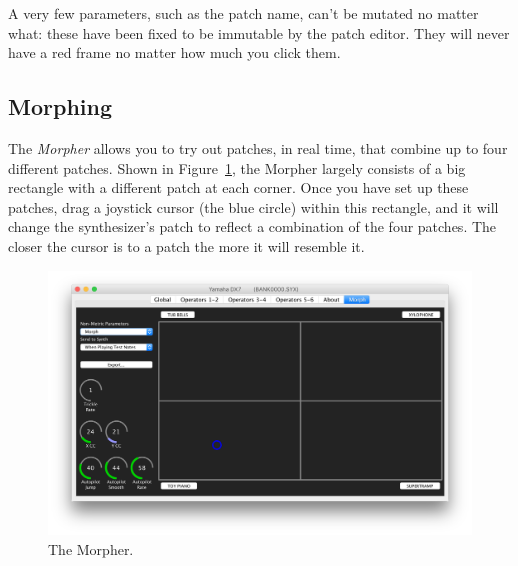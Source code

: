 \documentclass{article}
\begin{document}

A very few parameters, such as the patch name, can't be mutated no matter what: these have been fixed to be immutable by the patch editor.  They will never have a red frame no matter how much you click them.




\subsection{Morphing}
\label{morph}

The {\it Morpher} allows you to try out patches, in real time, that combine up to four different patches. Shown in Figure~\ref{morphpanel}, the Morpher largely consists of a big rectangle with a different patch at each corner.  Once you have set up these patches, drag a joystick cursor (the blue circle) within this rectangle, and it will change the synthesizer's patch to reflect a combination of the four patches.  The closer the cursor is to a patch the more it will resemble it.

\begin{figure}
\vspace{-2em}\includegraphics[scale=0.27]{Morph.png}
\vspace{-3em}
\caption{The Morpher.}
\vspace{-1em}
\label{morphpanel}
\end{figure}
\end{document}

